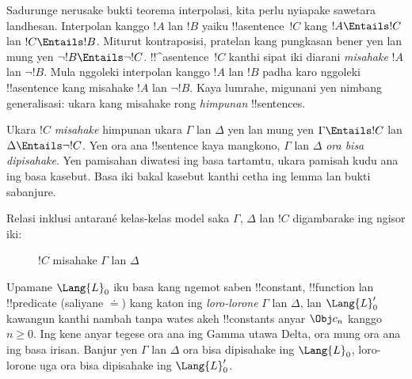 \documentclass[../../../include/open-logic-section]{subfiles}
\begin{document}


Sadurunge nerusake bukti teorema interpolasi,
kita perlu nyiapake sawetara landhesan. Interpolan
kanggo $!A$ lan $!B$ yaiku !!a{sentence}~$!C$ kang
$!A \Entails !C$ lan $!C \Entails !B$.
Miturut kontraposisi, pratelan kang pungkasan
bener yen lan mung yen $\lnot !B \Entails \lnot
!C$. !!^a{sentence}~$!C$ kanthi sipat iki diarani
\emph{misahake} $!A$ lan $\lnot !B$.
Mula nggoleki interpolan kanggo $!A$ lan $!B$
padha karo nggoleki !!a{sentence} kang misahake
$!A$ lan $\lnot !B$. Kaya lumrahe, migunani
yen nimbang generalisasi: ukara kang misahake
rong \emph{himpunan} !!{sentence}s.

\begin{defn}
Ukara $!C$ \emph{misahake} himpunan ukara $\Gamma$
lan $\Delta$ yen lan mung yen $\Gamma \Entails !C$
lan $\Delta \Entails \lnot !C$. Yen ora ana
!!{sentence} kaya mangkono, $\Gamma$ lan $\Delta$
\emph{ora bisa dipisahake}. Yen pamisahan diwatesi ing basa tartamtu, ukara pamisah kudu ana ing basa kasebut. Basa iki bakal kasebut kanthi cetha ing lemma lan bukti sabanjure.
\end{defn}

Relasi inklusi antarané kelas-kelas
model saka $\Gamma$, $\Delta$ lan $!C$
digambarake ing ngisor iki:
\begin{figure}[h]
  \centering
  \caption{$!C$ misahake $\Gamma$ lan $\Delta$}
\end{figure}


\begin{lem}
Upamane $\Lang{L}_0$ iku basa kang ngemot saben
!!{constant}, !!{function} lan !!{predicate}
(saliyane $\doteq$) kang katon ing \emph{loro-lorone}
$\Gamma$ lan $\Delta$, lan $\Lang{L}'_0$ kawangun
kanthi nambah tanpa wates akeh !!{constant}s anyar
$\Obj c_n$ kanggo $n \ge 0$. Ing kene anyar tegese ora ana ing Gamma utawa Delta, ora mung ora ana ing basa irisan. Banjur yen
$\Gamma$ lan $\Delta$ ora bisa dipisahake ing
$\Lang{L}_0$, loro-lorone uga ora bisa dipisahake
ing $\Lang{L}'_0$.
\end{lem}
\end{document}

